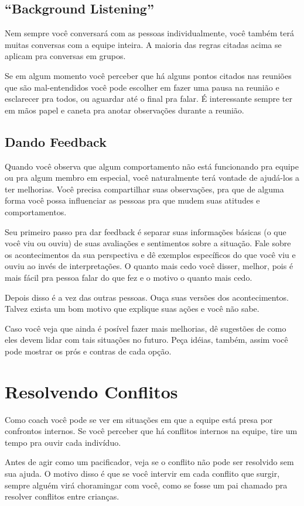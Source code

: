 \documentclass[a4paper, 10pt, font=plain]{abnt}
\begin{document}
\subsection{``Background Listening''}
Nem sempre você conversará com as pessoas individualmente, você também terá muitas conversas com a equipe inteira. A maioria das regras citadas acima se aplicam pra conversas em grupos.

Se em algum momento você perceber que há alguns pontos citados nas reuniões que são mal-entendidos você pode escolher em fazer uma pausa na reunião e esclarecer pra todos, ou aguardar até o final pra falar. É interessante sempre ter em mãos papel e caneta pra anotar observações durante a reunião.

\subsection{Dando Feedback}
Quando você observa que algum comportamento não está funcionando pra equipe ou pra algum membro em especial, você naturalmente terá vontade de ajudá-los a ter melhorias. Você precisa compartilhar suas observações, pra que de alguma forma você possa influenciar as pessoas pra que mudem suas atitudes e comportamentos.

Seu primeiro passo pra dar feedback é separar suas informações básicas (o que você viu ou ouviu) de suas avaliações e sentimentos sobre a situação. Fale sobre os acontecimentos da sua perspectiva e dê exemplos específicos do que você viu e ouviu ao invés de interpretações. O quanto mais cedo você disser, melhor, pois é mais fácil pra pessoa falar do que fez e o motivo o quanto mais cedo.

Depois disso é a vez das outras pessoas. Ouça suas versões dos acontecimentos. Talvez exista um bom motivo que explique suas ações e você não sabe.

Caso você veja que ainda é posível fazer mais melhorias, dê sugestões de como eles devem lidar com tais situações no futuro. Peça idéias, também, assim você pode mostrar os prós e contras de cada opção.


\section{Resolvendo Conflitos}
Como coach você pode se ver em situações em que a equipe está presa por confrontos internos. Se você perceber que há conflitos internos na equipe, tire um tempo pra ouvir cada indivíduo.

Antes de agir como um pacificador, veja se o conflito não pode ser resolvido sem sua ajuda. O motivo disso é que se você intervir em cada conflito que surgir, sempre alguém virá choramingar com você, como se fosse um pai chamado pra resolver conflitos entre crianças.
\end{document}
